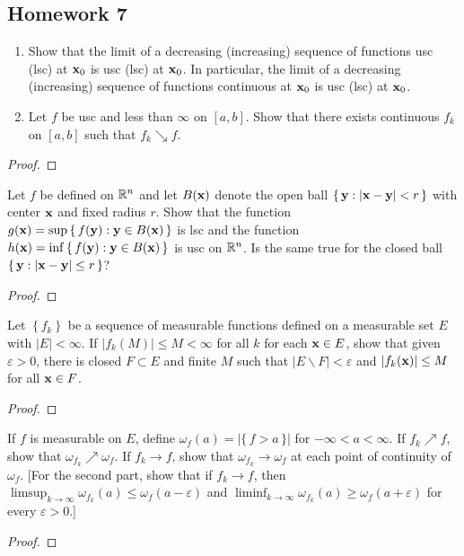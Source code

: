 \subsection{Homework 7}
\begin{problem}
\begin{enumerate}[label=(\alph*),noitemsep]
\item Show that the limit of a decreasing (increasing) sequence of
  functions usc (lsc) at $\mathbf{x}_0$ is usc (lsc) at $\mathbf{x}_0$. In particular,
  the limit of a decreasing (increasing) sequence of functions continuous
  at $\mathbf{x}_0$ is usc (lsc) at $\mathbf{x}_0$.
\item Let $f$ be usc and less than $\infty$ on $[a,b]$. Show that there
  exists continuous $f_k$ on $[a,b]$ such that $f_k\searrow f$.
\end{enumerate}
\end{problem}
\begin{proof}
\end{proof}

\begin{problem}
Let $f$ be defined on $\mathbb{R}^n$ and let $B(\mathbf{x})$ denote the open ball
$\left\{\,\mathbf{y}:|\mathbf{x}-\mathbf{y}|<r\,\right\}$ with center
$\mathbf{x}$ and fixed radius $r$. Show that the function
$g(\mathbf{x})=\sup\left\{\,f(\mathbf{y}):\mathbf{y}\in B(\mathbf{x})\,\right\}$ is lsc
and the function $h(\mathbf{x})=\inf\left\{\,f(\mathbf{y}):\mathbf{y}\in
B(\mathbf{x})\,\right\}$ is usc on $\mathbb{R}^n$. Is the same true for the closed ball
$\left\{\,\mathbf{y}:|\mathbf{x}-\mathbf{y}|\leq r\,\right\}$?
\end{problem}
\begin{proof}
\end{proof}

\begin{problem}
Let $\left\{f_k\right\}$ be a sequence of measurable functions defined on a
measurable set $E$ with $|E|<\infty$. If $|f_k(M)|\leq M<\infty$ for all
$k$ for each $\mathbf{x}\in E$, show that given $\varepsilon>0$, there is closed
$F\subset E$ and finite $M$ such that $|E\smallsetminus F|<\varepsilon$ and
$|f_k(\mathbf{x})|\leq M$ for all $\mathbf{x}\in F$.
\end{problem}
\begin{proof}
\end{proof}

\begin{problem}
If $f$ is measurable on $E$, define
$\omega_f(a)=|\{\,f>a\,\}|$ for
$-\infty<a<\infty$. If $f_k\nearrow f$, show that
$\omega_{f_k}\nearrow\omega_f$. If $f_k\to f$, show that
$\omega_{f_k}\to\omega_f$ at each point of continuity of $\omega_f$. [For
the second part, show that if $f_k\to f$, then
$\limsup_{k\to\infty}\omega_{f_k}(a)\leq\omega_f(a-\varepsilon)$ and
$\liminf_{k\to\infty}\omega_{f_k}(a)\geq\omega_f(a+\varepsilon)$ for every
$\varepsilon>0$.]
\end{problem}
\begin{proof}
\end{proof}

